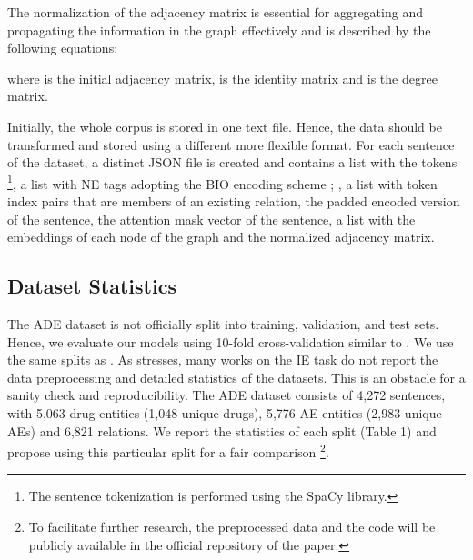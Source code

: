 \documentclass[11pt]{article}
\begin{document}
\par 
The normalization of the adjacency matrix is essential for aggregating and propagating the information in the graph effectively \cite{kipf2016semi} and is described by the following equations:
\vspace{-2mm}




\noindent where  is the initial adjacency matrix,  is the identity matrix and  is the degree matrix. 

Initially, the whole corpus is stored in one text file. Hence, the data should be transformed and stored using a different more flexible format. For each sentence of the dataset, a distinct JSON file is created and contains a list with the tokens \footnote{The sentence tokenization is performed using the SpaCy library.}, a list with NE tags adopting the BIO encoding scheme \cite{sang1999representing}; \cite{ratinov2009design}, a list with token index pairs that are members of an existing relation, the padded encoded version of the sentence, the attention mask vector of the sentence, a list with the embeddings of each node of the graph and the normalized adjacency matrix.

\vspace{-1mm}

\subsection{Dataset Statistics}

The ADE dataset is not officially split into training, validation, and test sets. Hence, we evaluate our models using 10-fold cross-validation similar to \cite{li2017neural}. We use the same splits as \cite{ebertsspan}. As \cite{taille2020let} stresses, many works on the IE task do not report the data preprocessing and detailed statistics of the datasets. This is an obstacle for a sanity check and reproducibility. The ADE dataset consists of 4,272 sentences, with 5,063 drug entities (1,048 unique drugs), 5,776 AE entities (2,983 unique AEs) and 6,821 relations. We report the statistics of each split (Table 1) and propose using this particular split for a fair comparison \footnote{To facilitate further research, the preprocessed data and the code will be publicly available in the official repository of the paper.}.
\end{document}
